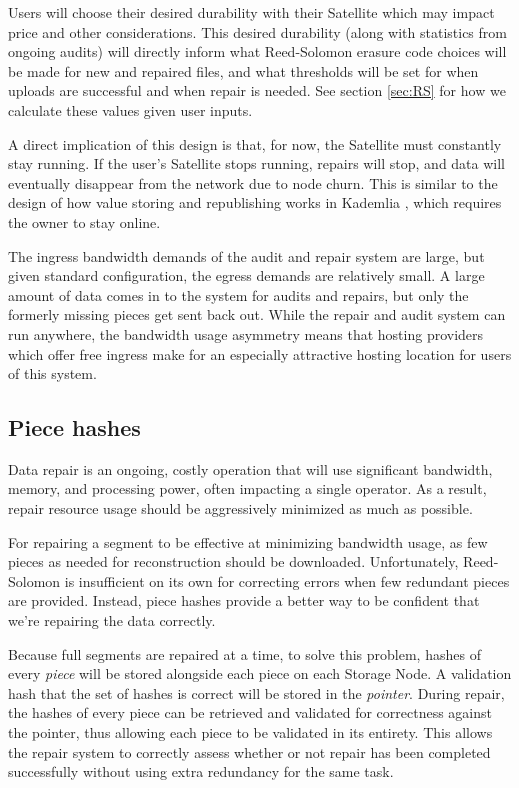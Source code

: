 \documentclass[8pt,fleqn,openany]{book}
\begin{document}
Users will choose their desired durability with their Satellite
which may impact price and other considerations. This desired durability (along with
statistics from ongoing audits) will directly inform what Reed-Solomon erasure
code choices will be made for new and repaired files, and what thresholds
will be set for when uploads are successful and when repair is needed. See
section \ref{sec:RS} for how we calculate these values given user inputs.

A direct implication of this design is that, for now, the Satellite must
constantly stay running. If the user's Satellite stops running, repairs will
stop, and data will eventually disappear from the network due to node churn.
This is similar to the design of how value storing and republishing works in
Kademlia \cite{kad}, which requires the owner to stay online.

The ingress bandwidth demands of the audit and repair system are large, but
given standard configuration, the egress demands are relatively small.
A large amount of data comes in to the system for audits and repairs, but only
the formerly missing pieces get sent back out.
While the repair and audit system can run anywhere, the bandwidth usage
asymmetry means that hosting providers which offer free ingress
make for an especially attractive hosting location for users of this system.

\subsection{Piece hashes}\label{sec:concrete-piece-hashes}

Data repair is an ongoing, costly operation that will use significant
bandwidth, memory, and processing power, often impacting a single operator.
As a result, repair resource usage should be aggressively minimized as much as
possible.

For repairing a segment to be effective at minimizing bandwidth usage, as few
pieces as needed for reconstruction should be downloaded. Unfortunately,
Reed-Solomon is insufficient on its own for correcting errors when few redundant
pieces are provided. Instead, piece hashes provide a better way to be
confident that we're repairing the data correctly.

Because full segments are repaired at a time, to solve this problem, hashes of
every {\em piece} will be stored alongside each piece on each Storage Node.
A validation hash that the set of hashes is correct will be stored in the
{\em pointer}. During repair, the hashes of every piece can be retrieved and
validated for correctness against the pointer, thus allowing each piece to
be validated in its entirety. This allows the repair system to correctly assess
whether or not repair has been completed successfully without using extra
redundancy for the same task.
\end{document}
